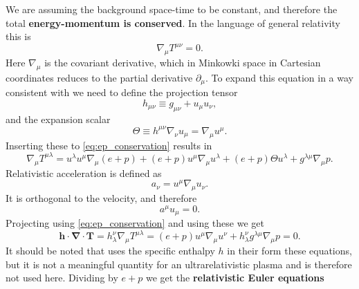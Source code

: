 We are assuming the background space-time to be constant, and therefore the total \textbf{energy-momentum is conserved}.
In the language of general relativity this is
\begin{equation}
\nabla_\mu T^{\mu\nu} = 0.
\label{eq:ep_conservation}
\end{equation}
Here $\nabla_\mu$ is the covariant derivative, which in Minkowki space in Cartesian coordinates reduces to the partial derivative $\partial_\mu$.
To expand this equation in a way consistent with \cite[ch. 3.3]{rezzolla_relativistic_2013} we need to define the projection tensor
\cite[eq. 3.9]{rezzolla_relativistic_2013}
\begin{equation}
h_{\mu\nu} \equiv g_{\mu\nu} + u_\mu u_\nu,
\label{eq:projection_tensor}
\end{equation}
and the expansion scalar
\cite[eq. 3.13]{rezzolla_relativistic_2013}
\begin{equation}
\Theta \equiv h^{\mu\nu} \nabla_\nu u_\mu = \nabla_\mu u^\mu.
\end{equation}
Inserting these to \eqref{eq:ep_conservation} results in
\begin{equation}
\nabla_\mu T^{\mu \lambda} = u^\lambda u^\mu \nabla_\mu (e+p) + (e+p) u^\mu \nabla_\mu u^\lambda + (e+p) \Theta u^\lambda + g^{\lambda\mu} \nabla_\mu p.
\end{equation}
Relativistic acceleration is defined as
\begin{equation}
a_\nu = u^\mu \nabla_\mu u_\nu.
\end{equation}
It is orthogonal to the velocity, and therefore
\begin{equation}
a^\mu u_\mu = 0.
\end{equation}
Projecting using \eqref{eq:ep_conservation} and using these we get
\cite[eq. 3.54]{rezzolla_relativistic_2013}
\begin{equation}
\bm{h} \cdot \bm{\nabla} \cdot \bm{T}
= h^\nu_\lambda \nabla_\mu T^{\mu \lambda}
= (e+p) u^\mu \nabla_\mu u^\nu + h^\nu_\lambda g^{\lambda\mu} \nabla_\mu p
= 0.
\end{equation}
It should be noted that \cite{rezzolla_relativistic_2013} uses the specific enthalpy $h$ in their form these equations, but it is not a meaningful quantity for an ultrarelativistic plasma and is therefore not used here.
Dividing by $e+p$ we get the \textbf{relativistic Euler equations}
